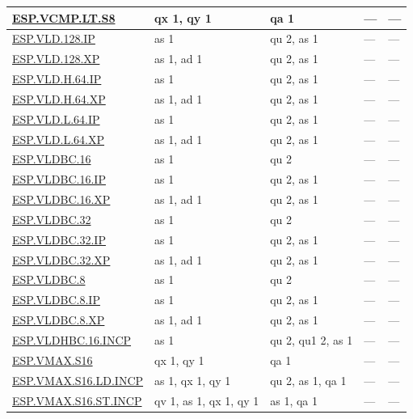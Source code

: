 \begin{longtable}[c]{|l|m{2.5cm}|m{2.5cm}|m{2.5cm}|m{2.5cm}|}
    \hyperref[instruction:ESPVCMPLTS8]{ESP.VCMP.LT.S8} & qx 1, qy 1 & qa 1 & — & — \\\hline
    \hyperref[instruction:ESPVLD128IP]{ESP.VLD.128.IP} & as 1 & qu 2, as 1 & — & — \\\hline
    \hyperref[instruction:ESPVLD128XP]{ESP.VLD.128.XP} & as 1, ad 1 & qu 2, as 1 & — & — \\\hline
    \hyperref[instruction:ESPVLDH64IP]{ESP.VLD.H.64.IP} & as 1 & qu 2, as 1 & — & — \\\hline
    \hyperref[instruction:ESPVLDH64XP]{ESP.VLD.H.64.XP} & as 1, ad 1 & qu 2, as 1 & — & — \\\hline
    \hyperref[instruction:ESPVLDL64IP]{ESP.VLD.L.64.IP} & as 1 & qu 2, as 1 & — & — \\\hline
    \hyperref[instruction:ESPVLDL64XP]{ESP.VLD.L.64.XP} & as 1, ad 1 & qu 2, as 1 & — & — \\\hline
    \hyperref[instruction:ESPVLDBC16]{ESP.VLDBC.16} & as 1 & qu 2 & — & — \\\hline
    \hyperref[instruction:ESPVLDBC16IP]{ESP.VLDBC.16.IP} & as 1 & qu 2, as 1 & — & — \\\hline
    \hyperref[instruction:ESPVLDBC16XP]{ESP.VLDBC.16.XP} & as 1, ad 1 & qu 2, as 1 & — & — \\\hline
    \hyperref[instruction:ESPVLDBC32]{ESP.VLDBC.32} & as 1 & qu 2 & — & — \\\hline
    \hyperref[instruction:ESPVLDBC32IP]{ESP.VLDBC.32.IP} & as 1 & qu 2, as 1 & — & — \\\hline
    \hyperref[instruction:ESPVLDBC32XP]{ESP.VLDBC.32.XP} & as 1, ad 1 & qu 2, as 1 & — & — \\\hline
    \hyperref[instruction:ESPVLDBC8]{ESP.VLDBC.8} & as 1 & qu 2 & — & — \\\hline
    \hyperref[instruction:ESPVLDBC8IP]{ESP.VLDBC.8.IP} & as 1 & qu 2, as 1 & — & — \\\hline
    \hyperref[instruction:ESPVLDBC8XP]{ESP.VLDBC.8.XP} & as 1, ad 1 & qu 2, as 1 & — & — \\\hline
    \hyperref[instruction:ESPVLDHBC16INCP]{ESP.VLDHBC.16.INCP} & as 1 & qu 2, qu1 2, as 1 & — & — \\\hline
    \hyperref[instruction:ESPVMAXS16]{ESP.VMAX.S16} & qx 1, qy 1 & qa 1 & — & — \\\hline
    \hyperref[instruction:ESPVMAXS16LDINCP]{ESP.VMAX.S16.LD.INCP} & as 1, qx 1, qy 1 & qu 2, as 1, qa 1 & — & — \\\hline
    \hyperref[instruction:ESPVMAXS16STINCP]{ESP.VMAX.S16.ST.INCP} & qv 1, as 1, qx 1, qy 1 & as 1, qa 1 & — & — \\\hline

\end{longtable}
